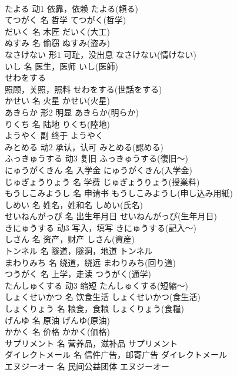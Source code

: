 \documentclass[8pt]{extreport}
\begin{document}
\begin{CJK}{UTF8}{min}
\\	たよる	动1	依靠，依赖	たよる(頼る)	
\\	てつがく	名	哲学	てつがく(哲学)	
\\	だいく	名	木匠	だいく(大工)	
\\	ぬすみ	名	偷窃	ぬすみ(盗み)	
\\	なさけない	形1	可耻，没出息	なさけない(情けない)	
\\	いし	名	医生，医师	いし(医師)	
\\	せわをする	
\\	照顾，关照，照料	せわをする(世話をする)	
\\	かせい	名	火星	かせい(火星)	
\\	あきらか	形2	明显	あきらか(明らか)	
\\	りくち	名	陆地	りくち(陸地)	
\\	ようやく	副	终于	ようやく	
\\	みとめる	动2	承认，认可	みとめる(認める)	
\\	ふっきゅうする	动3	复旧	ふっきゅうする(復旧～)	
\\	にゅうがくきん	名	入学金	にゅうがくきん(入学金)	
\\	じゅぎょうりょう	名	学费	じゅぎょうりょう(授業料)	
\\	もうしこみようし	名	申请书	もうしこみようし(申し込み用紙)	
\\	しめい	名	姓名，姓和名	しめい(氏名)	
\\	せいねんがっぴ	名	出生年月日	せいねんがっぴ(生年月日)	
\\	きにゅうする	动3	写入，填写	きにゅうする(記入～)	
\\	しさん	名	资产，财产	しさん(資産)	
\\	トンネル	名	隧道，隧洞，地道	トンネル	
\\	まわりみち	名	绕道，绕远	まわりみち(回り道)	
\\	つうがく	名	上学，走读	つうがく(通学)	
\\	たんしゅくする	动3	缩短	たんしゅくする(短縮～)	
\\	しょくせいかつ	名	饮食生活	しょくせいかつ(食生活)	
\\	しょくりょう	名	粮食，食粮	しょくりょう(食糧)	
\\	げんゆ	名	原油	げんゆ(原油)	
\\	かかく	名	价格	かかく(価格)	
\\	サプリメント	名	营养品，滋补品	サプリメント	
\\	ダイレクトメール	名	信件广告，邮寄广告	ダイレクトメール	
\\	エヌジーオー	名	民间公益团体	エヌジーオー

\end{CJK}
\end{document}

